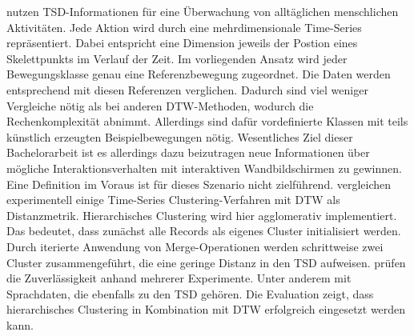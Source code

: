\citet{mohammadzade_dynamic_2021} nutzen \ac{TSD}-Informationen für eine Überwachung von alltäglichen menschlichen Aktivitäten.
Jede Aktion wird durch eine mehrdimensionale Time-Series repräsentiert.
Dabei entspricht eine Dimension jeweils der Postion eines Skelettpunkts im Verlauf der Zeit.
Im vorliegenden Ansatz wird jeder Bewegungsklasse genau eine Referenzbewegung zugeordnet.
Die Daten werden entsprechend mit diesen Referenzen verglichen.
Dadurch sind viel weniger Vergleiche nötig als bei anderen \ac{DTW}-Methoden,
wodurch die Rechenkomplexität abnimmt.
Allerdings sind dafür vordefinierte Klassen mit teils künstlich erzeugten Beispielbewegungen nötig.
Wesentliches Ziel dieser Bachelorarbeit ist es allerdings dazu beizutragen neue Informationen
über mögliche Interaktionsverhalten mit interaktiven Wandbildschirmen zu gewinnen.
Eine Definition im Voraus ist für dieses Szenario nicht zielführend.
\citet{hautamaki_time-series_2008} vergleichen experimentell einige Time-Series Clustering-Verfahren
mit \ac{DTW} als Distanzmetrik.
Hierarchisches Clustering wird hier agglomerativ implementiert.
Das bedeutet, dass zunächst alle Records als eigenes Cluster initialisiert werden.
Durch iterierte Anwendung von Merge-Operationen werden schrittweise zwei Cluster zusammengeführt,
die eine geringe Distanz in den \ac{TSD} aufweisen.
\citet{hautamaki_time-series_2008} prüfen die Zuverlässigkeit anhand mehrerer Experimente.
Unter anderem mit Sprachdaten, die ebenfalls zu den \ac{TSD} gehören.
Die Evaluation zeigt, dass hierarchisches Clustering in Kombination mit \ac{DTW} erfolgreich eingesetzt werden kann. 


